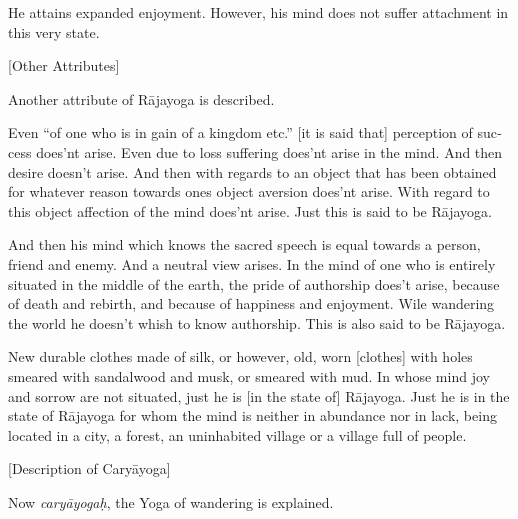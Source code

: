 \begin{otherlanguage}{english}
\begin{tlate}
    \end{tlate}
\begin{tlate}
  He attains expanded enjoyment. However, his mind does not suffer attachment in this very state.     
    \end{tlate}
    \bigskip
    \centerline{\textrm{\small{[Other Attributes]}}}
    \bigskip
  \begin{tlate}
    Another attribute of Rājayoga is described.
    \end{tlate}
    \begin{tlate}
     Even ``of one who is in gain of a kingdom etc.'' [it is said that] perception of success does'nt arise. Even due to loss suffering does'nt arise in the mind. And then desire doesn't arise. And then with regards to an object that has been obtained for whatever reason towards ones object aversion does'nt arise. With regard to this object affection of the mind does'nt arise. Just this is said to be Rājayoga. \\
    \end{tlate}
    \begin{tlate}
    And then his mind which knows the sacred speech is equal towards a person, friend and enemy. And a neutral view arises. In the mind of one who is entirely situated in the middle of the earth, the pride of authorship does't arise, because of death and rebirth, and because of happiness and enjoyment. Wile wandering the world he doesn't whish to know authorship. This is also said to be Rājayoga.
    \end{tlate}
  \begin{tlate}
    New durable clothes made of silk, or however, old, worn [clothes] with holes smeared with sandalwood and musk, or smeared with mud. In whose mind joy and sorrow are not situated, just he is [in the state of] Rājayoga. Just he is in the state of Rājayoga for whom the mind is neither in abundance nor in lack, being located in a city, a forest, an uninhabited village or a village full of people.    
  \end{tlate}
      \bigskip
    \centerline{\textrm{\small{[Description of Caryāyoga]}}}
      \bigskip
     \begin{tlate}
        Now \textit{caryāyogaḥ}, the Yoga of wandering is explained.
    \end{tlate}

\end{otherlanguage}
